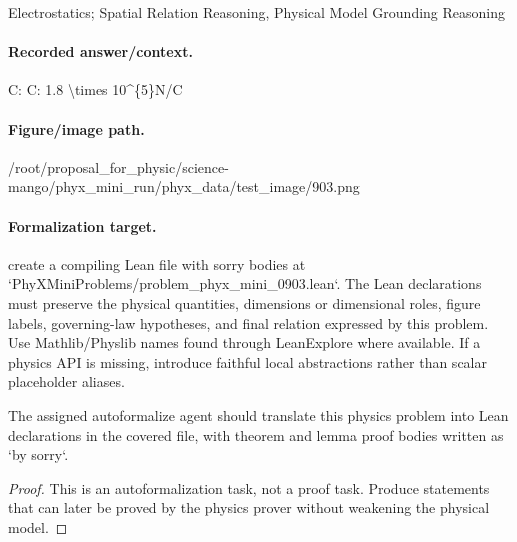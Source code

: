 Electrostatics; Spatial Relation Reasoning, Physical Model Grounding Reasoning

\paragraph{Recorded answer/context.}
C: C: 1.8 \textbackslash{}times 10\textasciicircum{}\{5\}N/C

\paragraph{Figure/image path.}
/root/proposal\_for\_physic/science-mango/phyx\_mini\_run/phyx\_data/test\_image/903.png

\paragraph{Formalization target.}
create a compiling Lean file with sorry bodies at `PhyXMiniProblems/problem\_phyx\_mini\_0903.lean`. The Lean declarations must preserve the physical quantities, dimensions or dimensional roles, figure labels, governing-law hypotheses, and final relation expressed by this problem.
Use Mathlib/Physlib names found through LeanExplore where available. If a physics API is missing, introduce faithful local abstractions rather than scalar placeholder aliases.

\begin{theorem}
\label{thm:physics:phyx_mini_0903:target}
The assigned autoformalize agent should translate this physics problem into Lean declarations in the covered file, with theorem and lemma proof bodies written as `by sorry`.
\end{theorem}
\begin{proof}
This is an autoformalization task, not a proof task. Produce statements that can later be proved by the physics prover without weakening the physical model.
\end{proof}

